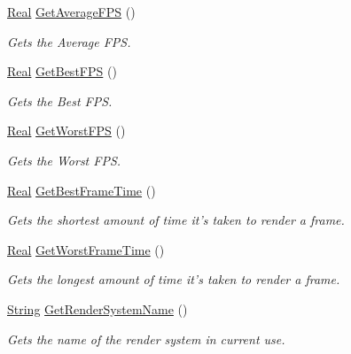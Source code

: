 \begin{DoxyCompactItemize}
\hyperlink{namespacephys_af7eb897198d265b8e868f45240230d5f}{Real} \hyperlink{classphys_1_1GraphicsManager_aaa43222ecf0a25841435651139539a94}{GetAverageFPS} ()
\begin{DoxyCompactList}\small\item\em Gets the Average FPS. \item\end{DoxyCompactList}\item 
\hyperlink{namespacephys_af7eb897198d265b8e868f45240230d5f}{Real} \hyperlink{classphys_1_1GraphicsManager_a6b644d683013467e1df4e115c4347be2}{GetBestFPS} ()
\begin{DoxyCompactList}\small\item\em Gets the Best FPS. \item\end{DoxyCompactList}\item 
\hyperlink{namespacephys_af7eb897198d265b8e868f45240230d5f}{Real} \hyperlink{classphys_1_1GraphicsManager_a52d675b375be04a02d6d91f27fb714a8}{GetWorstFPS} ()
\begin{DoxyCompactList}\small\item\em Gets the Worst FPS. \item\end{DoxyCompactList}\item 
\hyperlink{namespacephys_af7eb897198d265b8e868f45240230d5f}{Real} \hyperlink{classphys_1_1GraphicsManager_ab24bb81be1005487b2aab49af89c759c}{GetBestFrameTime} ()
\begin{DoxyCompactList}\small\item\em Gets the shortest amount of time it's taken to render a frame. \item\end{DoxyCompactList}\item 
\hyperlink{namespacephys_af7eb897198d265b8e868f45240230d5f}{Real} \hyperlink{classphys_1_1GraphicsManager_a96e6324466a121df5977446f019cee57}{GetWorstFrameTime} ()
\begin{DoxyCompactList}\small\item\em Gets the longest amount of time it's taken to render a frame. \item\end{DoxyCompactList}\item 
\hyperlink{namespacephys_aa03900411993de7fbfec4789bc1d392e}{String} \hyperlink{classphys_1_1GraphicsManager_a9138c2f79ff9b711494089802724615e}{GetRenderSystemName} ()
\begin{DoxyCompactList}\small\item\em Gets the name of the render system in current use. \item\end{DoxyCompactList}\item 

\end{DoxyCompactItemize}

